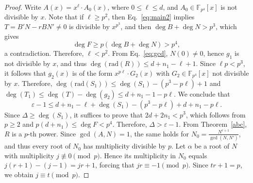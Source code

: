 \documentclass[10pt,a4paper]{amsart}
\newcommand{\F}{\mathbb{F}}
\newcommand{\rad}{\mathrm{rad}}
\begin{document}
\begin{proof}
Write $A(x)=x^{\ell}\cdot A_0(x)$, where $0\le \ell\le d$, and $A_0\in \F_{p^4}[x]$ is not divisible by $x$. 
Note that if $\ell \geq p^2$, then Eq.~\eqref{eq:main2} implies $T=B'N-rBN'\neq 0$ is divisible by $x^{p^3}$, and then  $\deg B+ \deg N >p^3$, which gives
$$\deg F\geq p(\deg B+\deg N)>p^4,$$
a contradiction. Therefore, $\ell < p^2$. From Eq.~\eqref{eq:gcd}, $N(0)\ne 0$, hence $g_1$ is not divisible by $x$, and thus $\deg(\rad(R))\le d+n_1-\ell+1$. Since  $\ell p<p^3$, it follows that   $g_2(x)$ is of the form $x^{p\ell}\cdot G_2(x)$ with $G_2\in \F_{p^4}[x]$ not divisible by $x$. Therefore, $\deg(\rad(S_1))\le  \deg(S_1)-(p^3-p\ell)+1$ and 
$\deg(T_1)\le \deg(T)-\deg(g_2) \leq d+n_1-1-p\ell$. We conclude that
$$\varepsilon-1\leq  d+n_1-\ell+\deg(S_1)-(p^3-p\ell)+d+n_1-p\ell.$$
Since $\Delta\ge \deg(S_1)$, it suffices to prove that $2d+2n_1< p^3$, which follows from $p\geq 2$ and $p(d+n_1)\leq \deg F<p^4$. Therefore, $\Delta>\varepsilon-1$.
From Theorem~\ref{abc}, $R$ is a $p$-th power. Since $\gcd(A, N)=1$, the same holds for $N_0=\frac{N^{r+1}}{\gcd(N, N')}$, and thus every root of $N_0$ has multiplicity divisible by $p$. Let $\alpha$ be a root of $N$ with multiplicity $j\not\equiv 0\pmod p$. Hence its multiplicity in $N_0$ equals $j(r+1)-(j-1)=jr+1$, forcing that $jr\equiv -1\pmod p$. Since $tr+1=p$, we obtain  $j\equiv t\pmod p$.
\end{proof}
\end{document}
